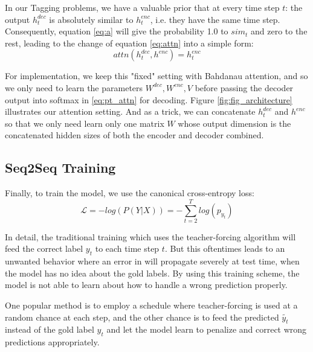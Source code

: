\documentclass[11pt,a4paper]{article}
\begin{document}
In our Tagging problems, we have a valuable prior that at every time step $t$: the output $h^{dec}_t$ is absolutely similar to $h^{enc}_t$, i.e. they have the same time step. Consequently, equation \ref{eq:a} will give the probability 1.0 to $sim_t$ and zero to the rest, leading to the change of equation \ref{eq:attn} into a simple form:
  \begin{equation}
	  attn(h^{dec}_t, h^{enc}) = h^{enc}_t
  \end{equation}

For implementation, we keep this "fixed" setting with Bahdanau attention, and so we only need to learn the parameters $W^{dec},W^{enc}, V$ before passing the decoder output into softmax in \ref{eq:pt_attn} for decoding. Figure \ref{fig:fig_architecture} illustrates our attention setting. And as a trick, we can concatenate $h^{dec}_t$ and $h^{enc}$ so that we only need learn only one matrix $W$ whose output dimension is the concatenated hidden sizes of both the encoder and decoder combined. 

\subsection{Seq2Seq Training}
Finally, to train the model, we use the canonical cross-entropy loss: 
  \begin{equation}
      \mathcal{L} = -log(P(Y|X)) = - \sum^T_{t=2} log(p_{y_t})
  \end{equation}
  
In detail, the traditional training which uses the teacher-forcing algorithm will feed the correct label $y_t$ to each time step $t$. But this oftentimes leads to an unwanted behavior where an error in will propagate severely at test time, when the model has no idea about the gold labels. By using this training scheme, the model is not able to learn about how to handle a wrong prediction properly. 

One popular method is to employ a schedule where teacher-forcing is used at a random chance at each step, and the other chance is to feed the predicted $\tilde{y_t}$ instead of the gold label $y_t$ and let the model learn to penalize and correct wrong predictions appropriately. 

\end{document}
